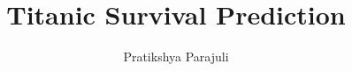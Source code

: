 \documentclass{amsart}
\begin{document}
%
%
\title[Titanic Survival Prediction]{Titanic Survival Prediction}%

\author{Pratikshya Parajuli}
\address[A.~1]{Ministry of Finance,\\ 
Government of Nepal}%

%
\date{\gitAuthorDate}%




\maketitle
\newpage
\tableofcontents

\newpage



%
%

\end{document}
